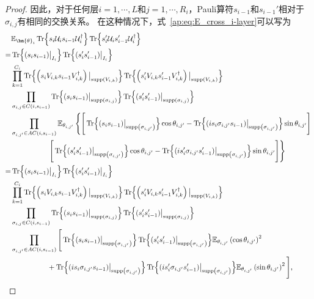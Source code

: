 \begin{lemma}
\begin{proof}
    因此，对于任何层$i=1,\cdots,L$和$j=1,\cdots,R_i$，Pauli算符$s_{i-1}$和$s_{i-1}'$相对于$\sigma_{i,j}$有相同的交换关系。 在这种情况下，式~\eqref{ap:eq:E_cross_i-layer}可以写为 
    \begin{equation}\label{ap:eq:E_cross_i-layer-rewrited}
        \begin{aligned}
        &\mathbb{E}_{\bm{\theta}_i}\Tr{s_i\mathcal{U}_i s_{i-1}\mathcal{U}_i^\dagger}\Tr{s'_i\mathcal{U}_i s'_{i-1}\mathcal{U}_i^\dagger}\\
        =&\Tr{(s_i s_{i-1})\big|_{I_i}}\Tr{(s'_i s'_{i-1})\big|_{I_i}}\\
        &\prod_{k=1}^{C_i}\Tr{\left(s_iV_{i,k} s_{i-1}V_{i,k}^{\dagger}\right)\big|_\g{V_{i,k}}}\Tr{\left(s'_iV_{i,k} s'_{i-1}V_{i,k}^{\dagger}\right)\big|_\g{V_{i,k}}}\\
        &\prod_{\sigma_{i,j}\in C(i,s_{i-1})}\Tr{(s_i s_{i-1})\big|_{\g{\sigma_{i,j}}}}\Tr{(s'_i s'_{i-1})\big|_{\g{\sigma_{i,j}}}}\\
        &\prod_{\sigma_{i,j'}\in AC(i,s_{i-1})}\mathbb{E}_{\theta_{i,j'}}\left\{ \Bigg[ \Tr{(s_i s_{i-1})\big|_{\g{\sigma_{i,j'}}}}\cos{\theta_{i,j'}}
        - \Tr{(is_i \sigma_{i,j'}s_{i-1})\big|_{\g{\sigma_{i,j'}}}}\sin{\theta_{i,j'}}\Bigg]\right.\\
        &\left.\quad\quad\quad\quad\quad\Bigg[ \Tr{(s'_i s'_{i-1})\big|_{\g{\sigma_{i,j'}}}}\cos{\theta_{i,j'}}
        - \Tr{(is'_i \sigma_{i,j'}s'_{i-1})\big|_{\g{\sigma_{i,j'}}}}\sin{\theta_{i,j'}}\Bigg]\right\}\\
        =&\Tr{(s_i s_{i-1})\big|_{I_i}}\Tr{(s'_i s'_{i-1})\big|_{I_i}}\\
        &\prod_{k=1}^{C_i}\Tr{\left(s_iV_{i,k} s_{i-1}V_{i,k}^{\dagger}\right)\big|_\g{V_{i,k}}}\Tr{\left(s'_iV_{i,k} s'_{i-1}V_{i,k}^{\dagger}\right)\big|_\g{V_{i,k}}}\\
        &\prod_{\sigma_{i,j}\in C(i,s_{i-1})}\Tr{(s_i s_{i-1})\big|_{\g{\sigma_{i,j}}}}\Tr{(s'_i s'_{i-1})\big|_{\g{\sigma_{i,j}}}}\\
        &\prod_{\sigma_{i,j'}\in AC(i,s_{i-1})}\Bigg[\Tr{(s_i s_{i-1})\big|_{\g{\sigma_{i,j'}}}}\Tr{(s'_i s'_{i-1})\big|_{\g{\sigma_{i,j'}}}}\mathbb{E}_{{\theta}_{i,j'}}\left(\cos{\theta_{i,j'}}\right)^2\\
        &\quad\quad\quad\quad\quad +\Tr{(is_i \sigma_{i,j'}s_{i-1})\big|_{\g{\sigma_{i,j'}}}}\Tr{(is'_i \sigma_{i,j'}s'_{i-1})\big|_{\g{\sigma_{i,j'}}}}\mathbb{E}_{{\theta}_{i,j'}}\left(\sin\theta_{i,j'}\right)^2\Bigg],
        \end{aligned}
    \end{equation}


\end{proof}
\end{lemma}

